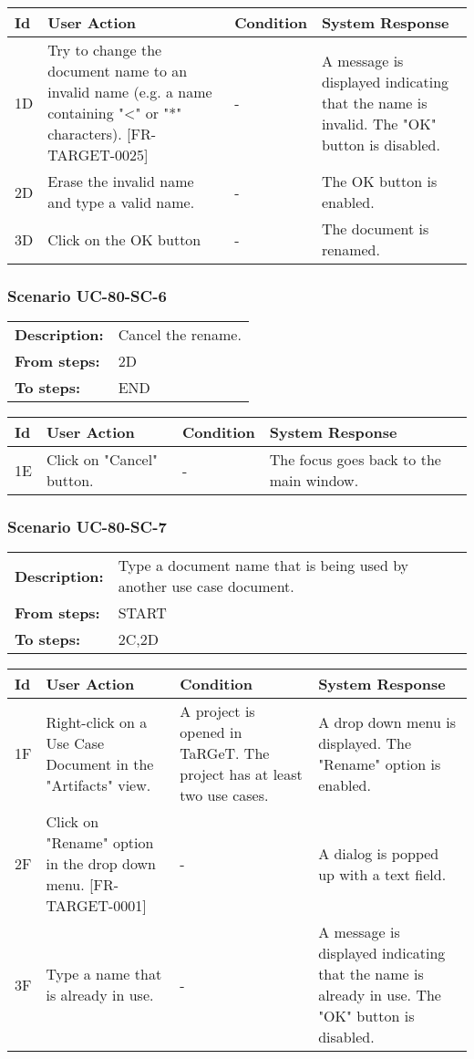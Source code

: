 \documentclass[a4paper,11pt]{article}
\newcommand{\bl}{\\ \hline}
\begin{document}
\begin{tabular}{|p{0.8in}|p{1.6in}|p{1.6in}|p{1.6in}|}
\hline
Id & User Action & Condition & System Response  \bl 
1D & Try to change the document name to an invalid name (e.g. a name containing "<" or "*" characters). [FR-TARGET-0025] & - & A message is displayed indicating that the name is invalid. The "OK" button is disabled. \bl 
2D & Erase the invalid name and type a valid name. & - & The OK button is enabled. \bl 
3D & Click on the OK button & - & The document is renamed. \bl 
\end{tabular}
\subsubsection*{Scenario UC-80-SC-6}
\begin{tabular}{p{1in}p{4in}}
{\bf Description:} & Cancel the rename. \\
{\bf From steps:} & 2D \\
{\bf To steps:} & END \\
\end{tabular}
 
\begin{tabular}{|p{0.8in}|p{1.6in}|p{1.6in}|p{1.6in}|}
\hline
Id & User Action & Condition & System Response  \bl 
1E & Click on "Cancel" button. & - & The focus goes back to the main window. \bl 
\end{tabular}
\subsubsection*{Scenario UC-80-SC-7}
\begin{tabular}{p{1in}p{4in}}
{\bf Description:} & Type a document name that is being used by another use case document. \\
{\bf From steps:} & START \\
{\bf To steps:} & 2C,2D \\
\end{tabular}
 
\begin{tabular}{|p{0.8in}|p{1.6in}|p{1.6in}|p{1.6in}|}
\hline
Id & User Action & Condition & System Response  \bl 
1F & Right-click on a Use Case Document in the "Artifacts" view. & A project is opened in TaRGeT. The project has at least two use cases. & A drop down menu is displayed. The "Rename" option is enabled. \bl 
2F & Click on "Rename" option in the drop down menu. [FR-TARGET-0001] & - & A dialog is popped up with a text field. \bl 
3F & Type a name that is already in use. & - & A message is displayed indicating that the name is already in use. The "OK" button is disabled. \bl 
\end{tabular}
\end{document}

